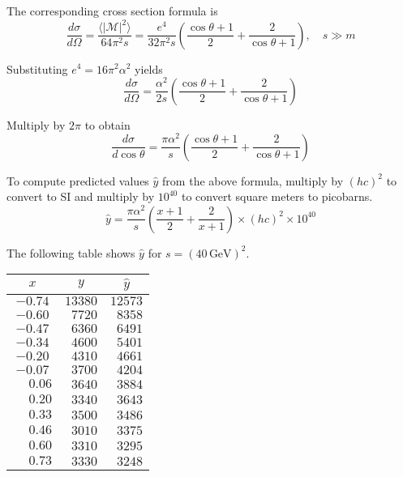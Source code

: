 The corresponding cross section formula is
\begin{equation*}
\frac{d\sigma}{d\Omega}
=\frac{\langle|\mathcal{M}|^2\rangle}{64\pi^2s}
=\frac{e^4}{32\pi^2s}
\left(
\frac{\cos\theta+1}{2}+\frac{2}{\cos\theta+1}
\right),\quad s\gg m
\end{equation*}

Substituting $e^4=16\pi^2\alpha^2$ yields
\begin{equation*}
\frac{d\sigma}{d\Omega}
=\frac{\alpha^2}{2s}
\left(
\frac{\cos\theta+1}{2}+\frac{2}{\cos\theta+1}
\right)
\end{equation*}

Multiply by $2\pi$ to obtain
\begin{equation*}
\frac{d\sigma}{d\cos\theta}
=\frac{\pi\alpha^2}{s}\left(
\frac{\cos\theta+1}{2}+\frac{2}{\cos\theta+1}
\right)
\end{equation*}

To compute predicted values $\hat{y}$ from the above formula,
multiply by $(hc)^2$ to convert to SI
and multiply by $10^{40}$ to convert square meters to picobarns.
\begin{equation*}
\hat{y}
=
\frac{\pi\alpha^2}{s}
\left(
\frac{x+1}{2}+
\frac{2}{x+1}
\right)
\times(hc)^2
\times10^{40}
\end{equation*}

The following table shows $\hat{y}$
for $s=(40\,\text{GeV})^2$.

\begin{center}
\begin{tabular}{|c|c|c|}
\hline
$x$ & $y$ & $\hat{y}$\\
\hline
$-0.74$ & $13380$ & $12573$\\
$-0.60$ & $\phantom{0}7720$ & $\phantom{0}8358$\\
$-0.47$ & $\phantom{0}6360$ & $\phantom{0}6491$\\
$-0.34$ & $\phantom{0}4600$ & $\phantom{0}5401$\\
$-0.20$ & $\phantom{0}4310$ & $\phantom{0}4661$\\
$-0.07$ & $\phantom{0}3700$ & $\phantom{0}4204$\\
$\phantom{+}0.06$ & $\phantom{0}3640$ & $\phantom{0}3884$\\
$\phantom{+}0.20$ & $\phantom{0}3340$ & $\phantom{0}3643$\\
$\phantom{+}0.33$ & $\phantom{0}3500$ & $\phantom{0}3486$\\
$\phantom{+}0.46$ & $\phantom{0}3010$ & $\phantom{0}3375$\\
$\phantom{+}0.60$ & $\phantom{0}3310$ & $\phantom{0}3295$\\
$\phantom{+}0.73$ & $\phantom{0}3330$ & $\phantom{0}3248$\\
\hline
\end{tabular}
\end{center}


